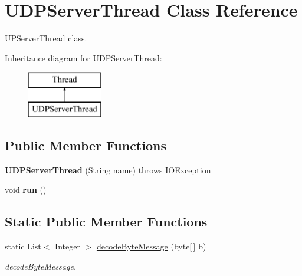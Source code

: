 \hypertarget{class_u_d_p_server_thread}{}\section{U\+D\+P\+Server\+Thread Class Reference}
\label{class_u_d_p_server_thread}


U\+P\+Server\+Thread class.  


Inheritance diagram for U\+D\+P\+Server\+Thread\+:\begin{figure}[H]
\begin{center}
\leavevmode
\includegraphics[height=2.000000cm]{class_u_d_p_server_thread}
\end{center}
\end{figure}
\subsection*{Public Member Functions}
\begin{DoxyCompactItemize}
\item 
{\bfseries U\+D\+P\+Server\+Thread} (String name)  throws I\+O\+Exception\hypertarget{class_u_d_p_server_thread_a1ec2d026557fc3be980f97de1564ae0a}{}\label{class_u_d_p_server_thread_a1ec2d026557fc3be980f97de1564ae0a}

\item 
void {\bfseries run} ()\hypertarget{class_u_d_p_server_thread_a6745593688fac3eb6098232d78f4cd01}{}\label{class_u_d_p_server_thread_a6745593688fac3eb6098232d78f4cd01}

\end{DoxyCompactItemize}
\subsection*{Static Public Member Functions}
\begin{DoxyCompactItemize}
\item 
static List$<$ Integer $>$ \hyperlink{class_u_d_p_server_thread_af5c340f848a87a00e26aa3099a815265}{decode\+Byte\+Message} (byte\mbox{[}$\,$\mbox{]} b)
\begin{DoxyCompactList}\small\item\em decode\+Byte\+Message. \end{DoxyCompactList}\end{DoxyCompactItemize}
